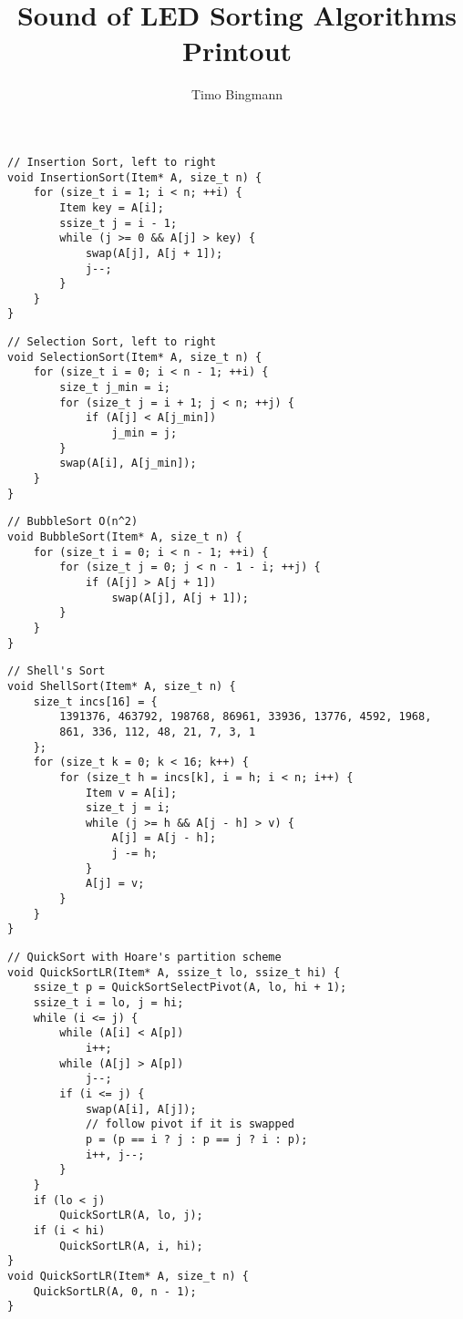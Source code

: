 \documentclass[a4paper,landscape,12pt,twoside,english]{scrartcl}
\title{Sound of LED Sorting Algorithms Printout}
\author{Timo Bingmann}
\begin{document}
\large\parskip=0pt

\fontsize{20}{22}\selectfont
\begin{verbatim}
// Insertion Sort, left to right
void InsertionSort(Item* A, size_t n) {
    for (size_t i = 1; i < n; ++i) {
        Item key = A[i];
        ssize_t j = i - 1;
        while (j >= 0 && A[j] > key) {
            swap(A[j], A[j + 1]);
            j--;
        }
    }
}
\end{verbatim}

\begin{verbatim}
// Selection Sort, left to right
void SelectionSort(Item* A, size_t n) {
    for (size_t i = 0; i < n - 1; ++i) {
        size_t j_min = i;
        for (size_t j = i + 1; j < n; ++j) {
            if (A[j] < A[j_min])
                j_min = j;
        }
        swap(A[i], A[j_min]);
    }
}
\end{verbatim}

\clearpage

\fontsize{16}{17.7}\selectfont
\begin{verbatim}
// BubbleSort O(n^2)
void BubbleSort(Item* A, size_t n) {
    for (size_t i = 0; i < n - 1; ++i) {
        for (size_t j = 0; j < n - 1 - i; ++j) {
            if (A[j] > A[j + 1])
                swap(A[j], A[j + 1]);
        }
    }
}
\end{verbatim}

\begin{verbatim}
// Shell's Sort
void ShellSort(Item* A, size_t n) {
    size_t incs[16] = {
        1391376, 463792, 198768, 86961, 33936, 13776, 4592, 1968,
        861, 336, 112, 48, 21, 7, 3, 1
    };
    for (size_t k = 0; k < 16; k++) {
        for (size_t h = incs[k], i = h; i < n; i++) {
            Item v = A[i];
            size_t j = i;
            while (j >= h && A[j - h] > v) {
                A[j] = A[j - h];
                j -= h;
            }
            A[j] = v;
        }
    }
}
\end{verbatim}

\clearpage
\fontsize{18}{20}\selectfont
\begin{verbatim}
// QuickSort with Hoare's partition scheme
void QuickSortLR(Item* A, ssize_t lo, ssize_t hi) {
    ssize_t p = QuickSortSelectPivot(A, lo, hi + 1);
    ssize_t i = lo, j = hi;
    while (i <= j) {
        while (A[i] < A[p])
            i++;
        while (A[j] > A[p])
            j--;
        if (i <= j) {
            swap(A[i], A[j]);
            // follow pivot if it is swapped
            p = (p == i ? j : p == j ? i : p);
            i++, j--;
        }
    }
    if (lo < j)
        QuickSortLR(A, lo, j);
    if (i < hi)
        QuickSortLR(A, i, hi);
}
void QuickSortLR(Item* A, size_t n) {
    QuickSortLR(A, 0, n - 1);
}
\end{verbatim}
\end{document}
